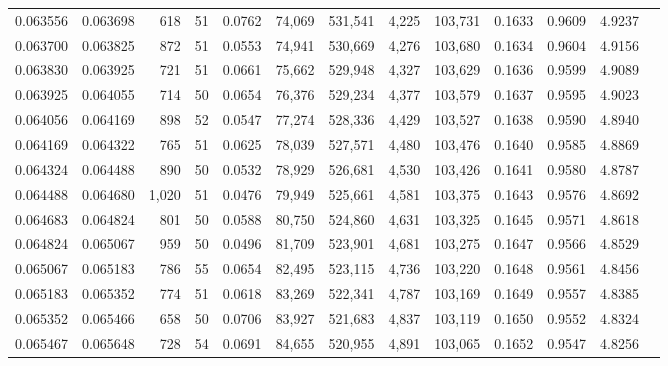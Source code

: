\begin{tabular}{rrrrrrrrrrrrr}
0.063556 & 0.063698 &   618 &  51 &                                     0.0762 &  74,069 & 531,541 &   4,225 & 103,731 & 0.1633 & 0.9609 & 4.9237 \\
0.063700 & 0.063825 &   872 &  51 &                                     0.0553 &  74,941 & 530,669 &   4,276 & 103,680 & 0.1634 & 0.9604 & 4.9156 \\
0.063830 & 0.063925 &   721 &  51 &                                     0.0661 &  75,662 & 529,948 &   4,327 & 103,629 & 0.1636 & 0.9599 & 4.9089 \\
0.063925 & 0.064055 &   714 &  50 &                                     0.0654 &  76,376 & 529,234 &   4,377 & 103,579 & 0.1637 & 0.9595 & 4.9023 \\
0.064056 & 0.064169 &   898 &  52 &                                     0.0547 &  77,274 & 528,336 &   4,429 & 103,527 & 0.1638 & 0.9590 & 4.8940 \\
0.064169 & 0.064322 &   765 &  51 &                                     0.0625 &  78,039 & 527,571 &   4,480 & 103,476 & 0.1640 & 0.9585 & 4.8869 \\
0.064324 & 0.064488 &   890 &  50 &                                     0.0532 &  78,929 & 526,681 &   4,530 & 103,426 & 0.1641 & 0.9580 & 4.8787 \\
0.064488 & 0.064680 & 1,020 &  51 &                                     0.0476 &  79,949 & 525,661 &   4,581 & 103,375 & 0.1643 & 0.9576 & 4.8692 \\
0.064683 & 0.064824 &   801 &  50 &                                     0.0588 &  80,750 & 524,860 &   4,631 & 103,325 & 0.1645 & 0.9571 & 4.8618 \\
0.064824 & 0.065067 &   959 &  50 &                                     0.0496 &  81,709 & 523,901 &   4,681 & 103,275 & 0.1647 & 0.9566 & 4.8529 \\
0.065067 & 0.065183 &   786 &  55 &                                     0.0654 &  82,495 & 523,115 &   4,736 & 103,220 & 0.1648 & 0.9561 & 4.8456 \\
0.065183 & 0.065352 &   774 &  51 &                                     0.0618 &  83,269 & 522,341 &   4,787 & 103,169 & 0.1649 & 0.9557 & 4.8385 \\
0.065352 & 0.065466 &   658 &  50 &                                     0.0706 &  83,927 & 521,683 &   4,837 & 103,119 & 0.1650 & 0.9552 & 4.8324 \\
0.065467 & 0.065648 &   728 &  54 &                                     0.0691 &  84,655 & 520,955 &   4,891 & 103,065 & 0.1652 & 0.9547 & 4.8256 \\

\end{tabular}
